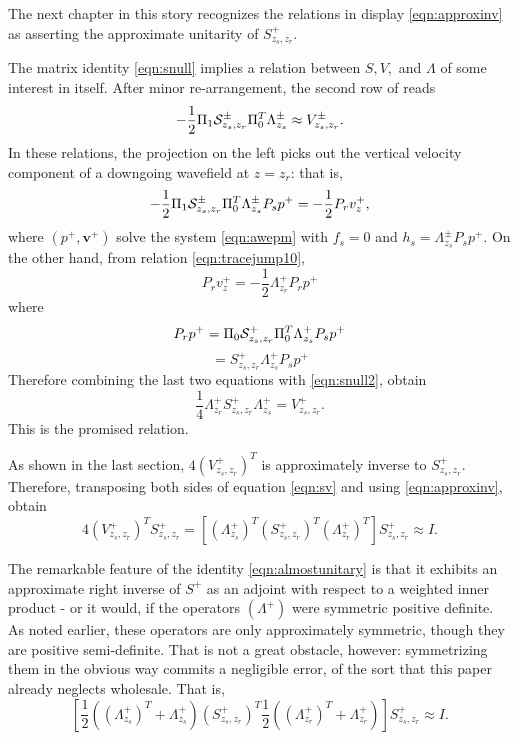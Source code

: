 \documentclass[georeport,12pt]{geophysics}
\newcommand{\bv}{\mathbf{v}}
\begin{document}
The next chapter in this story recognizes the relations in display
\ref{eqn:approxinv} as asserting the approximate unitarity of
$S^+_{z_s,z_r}$.

The matrix identity \ref{eqn:snull} implies a relation between $S, V,$
and $\Lambda$ of some interest in itself. After minor re-arrangement, the second row of reads
\begin{equation}
  \label{eqn:snull2}
-\frac{1}{2}\Pi_1{\cal S}^{\pm}_{z_s,z_r}\Pi_0^T\Lambda^{\pm}_{z_s}  \approx
V^{\pm}_{z_s,z_r}.
\end{equation}
In these relations, the projection on the left picks out the vertical velocity component
of a downgoing wavefield at $z=z_r$: that is,
\[
-\frac{1}{2}\Pi_1{\cal S}^{\pm}_{z_s,z_r}\Pi_0^T\Lambda^{\pm}_{z_s}P_sp^+
=-\frac{1}{2}P_r v_z^+,
\]
where $(p^+, \bv^+)$ solve the system \ref{eqn:awepm} with $f_s=0$ and
$h_s = \Lambda^{\pm}_{z_s}P_sp^+$. On the other hand, from relation
\ref{eqn:tracejump10},
\[
  P_r v_z^+ = -\frac{1}{2}\Lambda^+_{z_r}P_r p^+
\]
where
\[
  P_r p^+ = \Pi_0{\cal S}^{+}_{z_s,z_r}\Pi_0^T\Lambda^{+}_{z_s}P_s
  p^+
\]
\[
  = S^+_{z_s,z_r}\Lambda^{+}_{z_s}P_sp^+
\]
Therefore combining the last two equations with \ref{eqn:snull2},
obtain
\begin{equation}
  \label{eqn:sv}
  \frac{1}{4}\Lambda^+_{z_r}S^+_{z_s,z_r}\Lambda^{+}_{z_s} = V^+_{z_s,z_r}.
\end{equation}
This is the promised relation.


As shown in the last section, $4(V_{z_s,z_r}^+)^T$ is approximately
inverse to $S^{+}_{z_s,z_r}$. Therefore, transposing both sides of
equation \ref{eqn:sv} and using \ref{eqn:approxinv}, obtain
\begin{equation}
  \label{eqn:almostunitary}
  4(V_{z_s,z_r}^+)^TS^+_{z_s,z_r} = [ (\Lambda^+_{z_s})^T
  (S^{+}_{z_s,z_r})^T(\Lambda^+_{z_r})^T]S^{+}_{z_s,z_r} \approx I.
\end{equation}

The remarkable feature of the identity \ref{eqn:almostunitary} is that
it exhibits an approximate right inverse of $S^+$ as an adjoint with
respect to a weighted inner product - or it would, if the operators
$(\Lambda^+)$ were symmetric positive definite. As noted earlier,
these operators are only approximately symmetric, though they are
positive semi-definite. That is not a great obstacle, however:
symmetrizing them in the obvious way commits a negligible error, of
the sort that this paper already neglects wholesale. That is,
\begin{equation}
  \label{eqn:unitary}
  [ \frac{1}{2}((\Lambda^+_{z_s})^T+ \Lambda^+_{z_s})
  (S^{+}_{z_s,z_r})^T \frac{1}{2}((\Lambda^+_{z_r})^T+
  \Lambda^+_{z_r})]S^{+}_{z_s,z_r} \approx I.
\end{equation}
\end{document}
